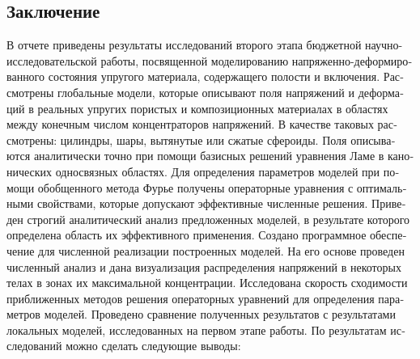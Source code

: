 
\begin{russian}
\setcounter{secnumdepth}{-1}
\chapter{Заключение}
\setcounter{secnumdepth}{2}

В отчете приведены результаты исследований второго этапа бюджетной науч\-но-ис\-сле\-до\-ва\-тель\-ской работы, посвященной моделированию на\-пря\-же\-н\-но-де\-фор\-ми\-ро\-ва\-н\-но\-го состояния упругого материала, содержащего полости и включения. Рассмотрены глобальные модели, которые описывают поля напряжений и деформаций в реальных упругих пористых и композиционных материалах в областях между конечным числом  концентраторов напряжений. В качестве таковых рассмотрены: цилиндры, шары, вытянутые или сжатые сфероиды. Поля описываются аналитически точно при помощи базисных решений уравнения Ламе в канонических односвязных областях. Для определения параметров моделей при помощи обобщенного метода Фурье получены операторные уравнения с оптимальными свойствами, которые допускают эффективные численные решения. Приведен строгий аналитический анализ предложенных моделей, в результате которого определена область их эффективного применения. Создано программное обеспечение для численной реализации построенных моделей. На его основе проведен численный анализ и дана визуализация распределения напряжений в некоторых телах в зонах их максимальной концентрации. Исследована скорость сходимости приближенных методов решения операторных уравнений для определения параметров моделей. Проведено сравнение полученных результатов с результатами локальных моделей, исследованных на первом этапе работы. По результатам исследований можно сделать следующие выводы:



\end{russian}
